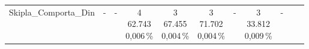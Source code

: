 \begin{table}[H]
{\begin{tabular}{lcccccccccc}
			\cmidrule(lr){2-11}
			\shortstack{Skipla\_Comporta\_Din                                                                                                                                                                \\ \,\\ \, }
			                     & \shortstack{-                                                                                                                                                             \\ \,\\ \, }
			                     & \shortstack{-                                                                                                                                                             \\ \,\\ \, }
			                     & \shortstack{4                                                                                                                                                             \\ 62.743 \\ 0,006\,\%}
			                     & \shortstack{3                                                                                                                                                             \\ 67.455 \\ 0,004\,\%}
			                     & \shortstack{3                                                                                                                                                             \\ 71.702 \\ 0,004\,\%}
			                     & \shortstack{-                                                                                                                                                             \\ \,\\ \, }
			                     & \shortstack{3                                                                                                                                                             \\ 33.812 \\ 0,009\,\%}
			                     & \shortstack{-                                                                                                                                                             \\ \,\\ \, }

\end{tabular}}
\end{table}
